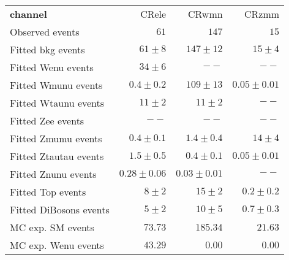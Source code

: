 

\begin{table}
\begin{center}
\setlength{\tabcolsep}{0.0pc}
{\small
\begin{tabular*}{\textwidth}{@{\extracolsep{\fill}}lrrr}
\noalign{\smallskip}\hline\noalign{\smallskip}
{\bf  channel}           & CRele            & CRwmn            & CRzmm              \\[-0.05cm]
\noalign{\smallskip}\hline\noalign{\smallskip}
Observed events          & $61$              & $147$              & $15$                    \\
\noalign{\smallskip}\hline\noalign{\smallskip}
Fitted bkg events         & $61 \pm 8$          & $147 \pm 12$          & $15 \pm 4$              \\
\noalign{\smallskip}\hline\noalign{\smallskip}
        Fitted Wenu events         & $34 \pm 6$            & $--$                        & $--$              \\
        Fitted Wmunu events         & $0.4 \pm 0.2$          & $109 \pm 13$            & $0.05 \pm 0.01$              \\
        Fitted Wtaunu events         & $11 \pm 2$           & $11 \pm 2$              & $--$              \\
        Fitted Zee events         & $--$                    & $--$                     & $--$              \\
        Fitted Zmumu events         & $0.4 \pm 0.1$          & $1.4 \pm 0.4$          & $14 \pm 4$              \\
        Fitted Ztautau events         & $1.5 \pm 0.5$          & $0.4 \pm 0.1$          & $0.05 \pm 0.01$              \\
        Fitted Znunu events         & $0.28 \pm 0.06$          & $0.03 \pm 0.01$          & $--$              \\
        Fitted Top events         & $8 \pm 2$                & $15 \pm 2$             & $0.2 \pm 0.2$              \\
        Fitted DiBosons events         & $5 \pm 2$          & $10 \pm 5$                & $0.7 \pm 0.3$              \\
 \noalign{\smallskip}\hline\noalign{\smallskip}
MC exp. SM events              & $73.73$          & $185.34$          & $21.63$              \\
\noalign{\smallskip}\hline\noalign{\smallskip}
        MC exp. Wenu events         & $43.29$          & $0.00$          & $0.00$              \\

\end{tabular*}}
\end{center}
\end{table}
